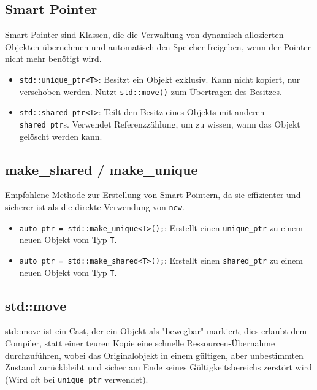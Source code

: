 \documentclass[10pt, a3paper, landscape]{article}
\begin{document}
\begin{multicols*}{4}
\section{Smart Pointer}

Smart Pointer sind Klassen, die die Verwaltung von dynamisch allozierten Objekten übernehmen und automatisch den Speicher freigeben, wenn der Pointer nicht mehr benötigt wird.

\begin{itemize}
    \item \lstinline|std::unique_ptr<T>|: Besitzt ein Objekt exklusiv. Kann nicht kopiert, nur verschoben werden. Nutzt \lstinline|std::move()| zum Übertragen des Besitzes.
    \item \lstinline|std::shared_ptr<T>|: Teilt den Besitz eines Objekts mit anderen \lstinline|shared_ptr|s. Verwendet Referenzzählung, um zu wissen, wann das Objekt gelöscht werden kann.
\end{itemize}

\newline\newline
\subsection*{make\_shared / make\_unique}

Empfohlene Methode zur Erstellung von Smart Pointern, da sie effizienter und sicherer ist als die direkte Verwendung von \lstinline|new|.

\begin{itemize}
    \item \lstinline|auto ptr = std::make_unique<T>();|: Erstellt einen \lstinline|unique_ptr| zu einem neuen Objekt vom Typ \lstinline|T|.
    \item \lstinline|auto ptr = std::make_shared<T>();|: Erstellt einen \lstinline|shared_ptr| zu einem neuen Objekt vom Typ \lstinline|T|.
\end{itemize}

\subsection*{std::move}

std::move ist ein Cast, der ein Objekt als "bewegbar" markiert; dies erlaubt dem Compiler, statt einer teuren Kopie eine schnelle Ressourcen-Übernahme durchzuführen, wobei das Originalobjekt in einem gültigen, aber unbestimmten Zustand zurückbleibt und sicher am Ende seines Gültigkeitsbereichs zerstört wird (Wird oft bei \lstinline|unique_ptr| verwendet).


\end{multicols*}
\end{document}
